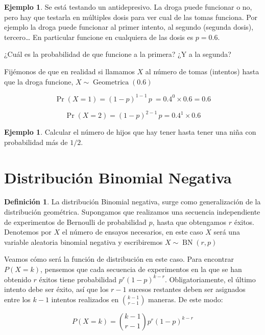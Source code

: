 \documentclass[]{book}
\theoremstyle{plain}
\theoremstyle{definition}
\newtheorem{definition}[theorem]{Definición}
\newtheorem{example}[theorem]{Ejemplo}
\theoremstyle{definition} %
\begin{document}
\begin{example}
   
Se está testando un antidepresivo. La droga puede funcionar o no, pero
hay que testarla en múltiples dosis para ver cual de las tomas funciona.
Por ejemplo la droga puede funcionar al primer intento, al segundo
(segunda dosis), tercero\ldots{} En particular funcione en cualquiera de
las dosis es \(p=0.6\).

¿Cuál es la probabilidad de que funcione a la primera? ¿Y a la segunda?

Fijémonos de que en realidad si llamamos \(X\) al número de tomas
(intentos) hasta que la droga funcione,
\(\displaystyle X\sim \operatorname {Geometrica} (0.6)\)


\[\displaystyle \Pr(X=1)=(1-p)^{1-1}\,p\ =0.4^{0}\times 0.6=0.6\]

\[\displaystyle \Pr(X=2)=(1-p)^{2-1}\,p=0.4^{1}\times 0.6\]
\end{example}

\begin{example} 
Calcular el número de hijos que hay tener hasta tener una niña con
probabilidad más de \(1/2\).
\end{example}



 \section{Distribución Binomial
Negativa} 


\begin{definition}
La distribución Binomial negativa, surge como generalización de la
distribución geométrica. Supongamos que realizamos una secuencia
independiente de experimentos de Bernoulli de probabilidad \(p\), hasta
que obtengamos \(r\) éxitos. Denotemos por \(X\) el número de ensayos
necesarios, en este caso \(X\) será una variable aleatoria binomial
negativa y escribiremos \(\displaystyle X\sim \operatorname {BN} (r,p)\)

Veamos cómo será la función de distribución en este caso. Para encontrar
\(P(X=k)\), pensemos que cada secuencia de experimentos en la que se han
obtenido \(r\) éxitos tiene probabilidad \(p^r(1-p)^{k-r}\).
Obligatoriamente, el último intento debe ser éxito, así que los \(r-1\)
sucesos restantes deben ser asignados entre los \(k-1\) intentos
realizados en \({k-1 \choose r-1}\) maneras. De este modo:

\[P(X=k) = {k-1 \choose r-1} p^r (1-p)^{k-r}\]
\end{definition}
\end{document}
